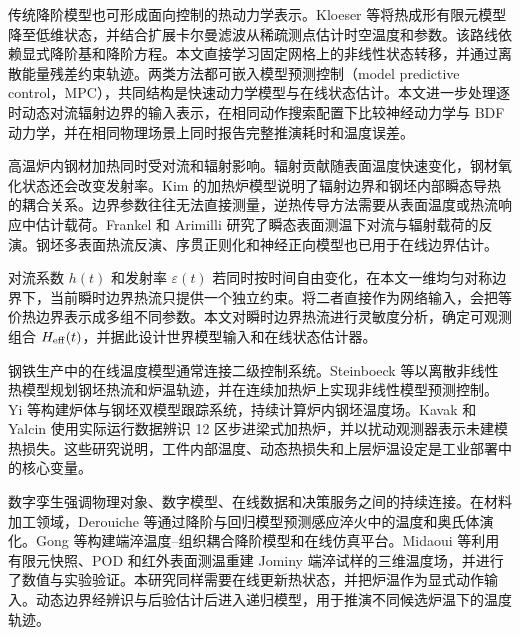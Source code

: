 传统降阶模型也可形成面向控制的热动力学表示。Kloeser 等将热成形有限元模型降至低维状态，并结合扩展卡尔曼滤波从稀疏测点估计时空温度和参数\cite{kloeser2021rom}。该路线依赖显式降阶基和降阶方程。本文直接学习固定网格上的非线性状态转移，并通过离散能量残差约束轨迹。两类方法都可嵌入模型预测控制（model predictive control，MPC）\cite{rawlings2017mpc}，共同结构是快速动力学模型与在线状态估计。本文进一步处理逐时动态对流辐射边界的输入表示，在相同动作搜索配置下比较神经动力学与 BDF 动力学，并在相同物理场景上同时报告完整推演耗时和温度误差。


高温炉内钢材加热同时受对流和辐射影响。辐射贡献随表面温度快速变化，钢材氧化状态还会改变发射率。Kim 的加热炉模型说明了辐射边界和钢坯内部瞬态导热的耦合关系\cite{kim2007furnace}。边界参数往往无法直接测量，逆热传导方法需要从表面温度或热流响应中估计载荷。Frankel 和 Arimilli 研究了瞬态表面测温下对流与辐射载荷的反演\cite{frankel2007loads}。钢坯多表面热流反演、序贯正则化和神经正向模型也已用于在线边界估计\cite{li2015slabflux,chen2019online,mohebbi2021htc}。

对流系数 $h(t)$ 和发射率 $\varepsilon(t)$ 若同时按时间自由变化，在本文一维均匀对称边界下，当前瞬时边界热流只提供一个独立约束。将二者直接作为网络输入，会把等价热边界表示成多组不同参数。本文对瞬时边界热流进行灵敏度分析，确定可观测组合 ${H_{\mathrm{eff}}}(t)$，并据此设计世界模型输入和在线状态估计器。


钢铁生产中的在线温度模型通常连接二级控制系统。Steinboeck 等以离散非线性热模型规划钢坯热流和炉温轨迹，并在连续加热炉上实现非线性模型预测控制\cite{steinboeck2011trajectory,steinboeck2013nmpc}。Yi 等构建炉体与钢坯双模型跟踪系统，持续计算炉内钢坯温度场\cite{yi2017tracking}。Kavak 和 Yalcin 使用实际运行数据辨识 12 区步进梁式加热炉，并以扰动观测器表示未建模热损失\cite{kavak2023furnace}。这些研究说明，工件内部温度、动态热损失和上层炉温设定是工业部署中的核心变量。

数字孪生强调物理对象、数字模型、在线数据和决策服务之间的持续连接\cite{tao2018digitaltwin,stark2019digitaltwin}。在材料加工领域，Derouiche 等通过降阶与回归模型预测感应淬火中的温度和奥氏体演化\cite{derouiche2021induction}。Gong 等构建端淬温度--组织耦合降阶模型和在线仿真平台\cite{gong2026heatrom}。Midaoui 等利用有限元快照、POD 和红外表面测温重建 Jominy 端淬试样的三维温度场，并进行了数值与实验验证\cite{midaoui2026jominy}。本研究同样需要在线更新热状态，并把炉温作为显式动作输入。动态边界经辨识与后验估计后进入递归模型，用于推演不同候选炉温下的温度轨迹。

